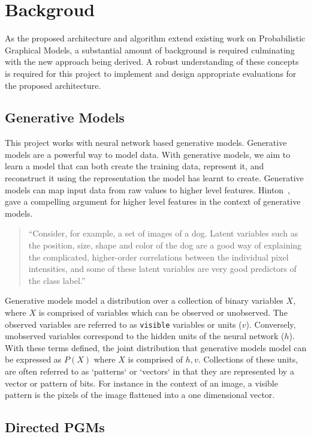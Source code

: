 \chapter{Backgroud}

As the proposed architecture and algorithm extend existing work on Probabilistic Graphical Models, a substantial amount of background is required culminating with the new approach being derived. A robust understanding of these concepts is required for this project to implement and design appropriate evaluations for the proposed architecture.

\section{Generative Models}\label{S:Generative-Models}

This project works with neural network based generative models.
Generative models are a powerful way to model data. With generative models, we aim to learn a model that can both create the training data, represent it, and reconstruct it using the representation the model has learnt to create. Generative models can map input data from raw values to higher level features. Hinton~\cite{hinton:32723:vv}, gave a compelling argument for higher level features in the context of generative models. \begin{quote} ``Consider, for example, a set of images of a dog. Latent variables such as the position, size, shape and color of the dog are a good way of explaining the complicated, higher-order correlations between the individual pixel intensities, and some of these latent variables are very good predictors of the class label.''\end{quote}

Generative models model a distribution over a collection of binary variables $X$, where $X$ is comprised of variables which can be observed or unobserved. The observed variables are referred to as \texttt{visible} variables or units ($v$). Conversely, unobserved variables correspond to the hidden units of the neural network ($h$). With these terms defined, the joint distribution that generative models model can be expressed as $P(X)$ where $X$ is comprised of $h,v$. Collections of these units, are often referred to as `patterns` or `vectors` in that they are represented by a vector or pattern of bits. For instance in the context of an image, a visible pattern is the pixels of the image flattened into a one dimensional vector.

\section{Directed PGMs}

